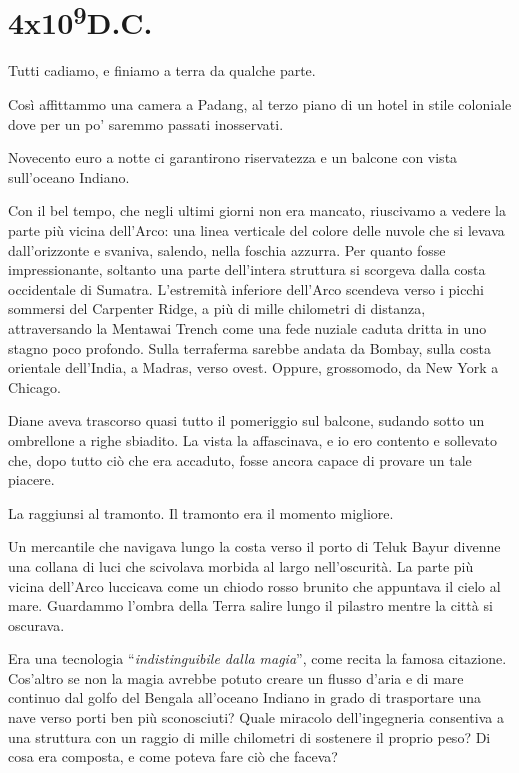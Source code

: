 \mainmatter

\chapter{4x10\textsuperscript{9}D.C.}\label{4x10^9}

\hfill\break

Tutti cadiamo, e finiamo a terra da qualche parte.

Così affittammo una camera a Padang, al terzo piano di un hotel in stile
coloniale dove per un po' saremmo passati inosservati.

Novecento euro a notte ci garantirono riservatezza e un balcone con
vista sull'oceano Indiano.

Con il bel tempo, che negli ultimi giorni non era mancato, riuscivamo a
vedere la parte più vicina dell'Arco: una linea verticale del colore
delle nuvole che si levava dall'orizzonte e svaniva, salendo, nella
foschia azzurra. Per quanto fosse impressionante, soltanto una parte
dell'intera struttura si scorgeva dalla costa occidentale di Sumatra.
L'estremità inferiore dell'Arco scendeva verso i picchi sommersi del
Carpenter Ridge, a più di mille chilometri di distanza, attraversando la
Mentawai Trench come una fede nuziale caduta dritta in uno stagno poco
profondo. Sulla terraferma sarebbe andata da Bombay, sulla costa
orientale dell'India, a Madras, verso ovest. Oppure, grossomodo, da New
York a Chicago.

Diane aveva trascorso quasi tutto il pomeriggio sul balcone, sudando
sotto un ombrellone a righe sbiadito. La vista la affascinava, e io ero
contento e sollevato che, dopo tutto ciò che era accaduto, fosse ancora
capace di provare un tale piacere.

La raggiunsi al tramonto. Il tramonto era il momento migliore.

Un mercantile che navigava lungo la costa verso il porto di Teluk Bayur
divenne una collana di luci che scivolava morbida al largo
nell'oscurità. La parte più vicina dell'Arco luccicava come un chiodo
rosso brunito che appuntava il cielo al mare. Guardammo l'ombra della
Terra salire lungo il pilastro mentre la città si oscurava.

Era una tecnologia ``\emph{indistinguibile dalla magia}'', come recita
la famosa citazione. Cos'altro se non la magia avrebbe potuto creare un
flusso d'aria e di mare continuo dal golfo del Bengala all'oceano
Indiano in grado di trasportare una nave verso porti ben più
sconosciuti? Quale miracolo dell'ingegneria consentiva a una struttura
con un raggio di mille chilometri di sostenere il proprio peso? Di cosa
era composta, e come poteva fare ciò che faceva?

